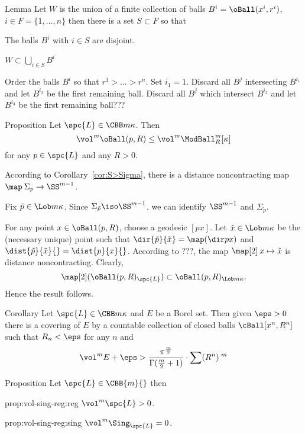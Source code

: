 \begin{thm}{Lemma}
Let $W$ is the union of a finite collection of balls
$B^i=\oBall(x^i , r^i)$, $i\in F=\{1,\dots,n\}$
then there is a set $S\subset F$ so that
\begin{subthm}{}
The balls $B^i$ with
 $i\in S$ are disjoint.
\end{subthm}

\begin{subthm}{}$W\subset \bigcup_{i\in S}B^i$
\end{subthm}
\end{thm}

Order the  balls $B^i$ so that $r^1>\dots>r^n$.
Set $i_1=1$.
Discard all $B^j$ intersecting $B^{i_1}$ and 
let $B^{i_2}$ be the first remaining ball.
Discard all $B^j$ which intersect $B^{i_2}$
and let $B^{i_3}$ be the first remaining ball???
\qeds


\begin{thm}{Proposition}\label{prop:vol=<}
Let $\spc{L}\in\CBB m\kappa$.
Then
$$\vol^m\oBall(p,R)\le \vol^m\ModBall^m_R[\kappa]$$
for any $p\in \spc{L}$ and any $R>0$.
\end{thm}

According to Corollary~\ref{cor:S>Sigma},
there is a distance noncontracting map $\map\:\Sigma_p\to\SS^{m-1}$.

Fix $\tilde p\in \Lob m\kappa$.
Since $\Sigma_{\tilde p}\iso\SS^{m-1}$,
we can identify $\SS^{m-1}$ and $\Sigma_{\tilde p}$.

For any point $x\in\oBall(p,R)$,
choose a geodesic $[px]$.
Let $\tilde x\in\Lob m\kappa$ be the (necessary unique) point such that
$\dir{\tilde p}{\tilde x}=\map(\dir px)$ and $\dist{\tilde p}{\tilde x}{}=\dist{p}{x}{}$.
According to ???, the map $\map[2]\:x\mapsto \tilde x$ is distance noncontracting.
Clearly, 
$$\map[2](\oBall(p,R)_{\spc{L}})\subset \oBall(p,R)_{\Lob m\kappa}.$$
Hence the result follows.
\qeds

\begin{thm}{Corollary}
Let $\spc{L}\in\CBB m\kappa$ and $E$ be a Borel set.
Then given $\eps>0$ there is a covering of $E$ by a countable collection of closed balls $\cBall[x^n,R^n]$ such that $R_n<\eps$ 
for any $n$ and 
$$\vol^m E+\eps>
\frac{\pi^{\frac m2}}{\Gamma(\frac m2+1)}\cdot\sum (R^n)^{\cdot m}
$$
\end{thm}



\begin{thm}{Proposition}\label{prop:vol-sing-reg}
Let $\spc{L}\in\CBB{m}{}$ then 
\begin{subthm}{prop:vol-sing-reg:reg}
$\vol^m\spc{L}>0$.
\end{subthm}
\begin{subthm}{prop:vol-sing-reg:sing}
$\vol^m\Sing_\spc{L}=0$.
\end{subthm}
\end{thm}

